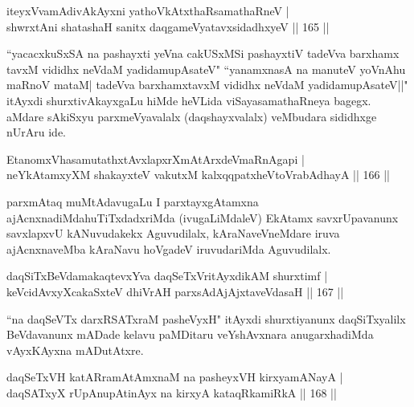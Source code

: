 \begin{shl}
iteyxVvamAdivAkAyxni yathoVkAtxthaRsamathaRneV |\\
shwrxtAni shatashaH sanitx daqgameVyatavxsidadhxyeV \hfill || 165 ||
\end{shl}

\begin{artha}%
 ``yacacxkuSxSA na pashayxti yeVna cakUSxMSi pashayxtiV tadeVva barxhamx tavxM vididhx neVdaM yadidamupAsateV" ``yanamxnasA na manuteV yoVnAhu maRnoV mataM| tadeVva barxhamxtavxM vididhx neVdaM yadidamupAsateV||" itAyxdi shurxtivAkayxgaLu hiMde heVLida viSaya\break samathaRneya bagegx. aMdare sAkiSxyu parxmeVyavalalx (daqshayxvalalx) veMbudara sididhxge nUrAru ide.
\end{artha}

\begin{shl}
EtanomxVhasamutathxtAvxlapxrXmAtArxdeVmaRnAgapi |\\
neYkAtamxyXM shakayxteV vakutxM kalxqqpatxheVtoVrabAdhayA \hfill || 166 ||
\end{shl}

\begin{artha}
parxmAtaq muMtAdavugaLu I parxtayxgAtamxna ajAcnxnadiMda\break huTiTxdadxriMda (ivugaLiMdaleV) EkAtamx savxrUpavanunx savxlapxvU kANuvudakekx Aguvudilalx, kAraNaveVneMdare iruva ajAcnxnaveMba kAraNavu hoVgadeV iruvudariMda Aguvudilalx. 
\end{artha}


\begin{shl}
daqSiTxBeVdamakaqtevxYva daqSeTxVritAyxdikAM shurxtimf |\\
keVcidAvxyXcakaSxteV dhiVrAH parxsAdAjAjxtaveVdasaH \hfill || 167 ||
\end{shl}

\begin{artha}
``na daqSeVTx darxRSATxraM pasheVyxH" itAyxdi shurxtiyanunx daqSiTxyalilx BeVdavanunx mADade kelavu paMDitaru veYshAvxnara anugarxhadiMda vAyxKAyxna mADutAtxre.
\end{artha}%


\begin{shl}
daqSeTxVH katARramAtAmxnaM na pasheyxVH kirxyamANayA |\\
daqSATxyX rUpAnupAtinAyx na kirxyA kataqRkamiRkA \hfill || 168 ||
\end{shl}

